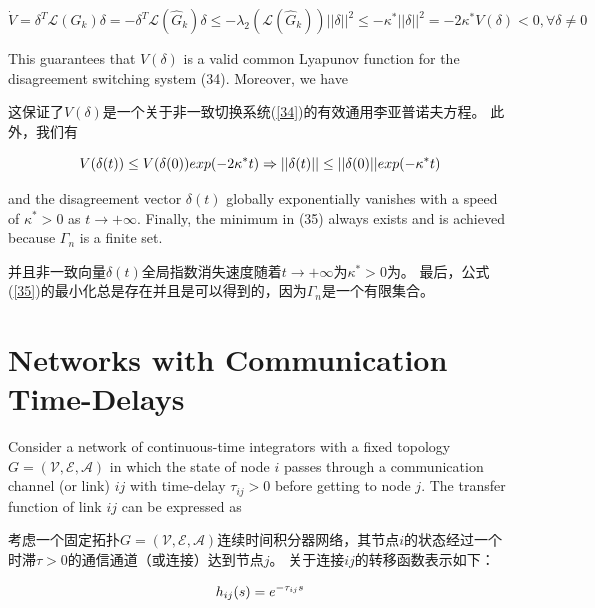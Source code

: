 \documentclass{article}
\begin{document}
\begin{equation}
    \tag{36}
    \label{36}
    \dot{V} = \delta^T\mathcal{L}(G_k)\delta = -\delta^T\mathcal{L}(\hat{G}_k)\delta \le -\lambda_2(\mathcal{L}(\hat{G}_k))||\delta||^2 \le -\kappa^*||\delta||^2 = -2\kappa^*V(\delta)<0,\forall \delta \ne 0
\end{equation}

{\color[gray]{0.5}
\noindent This guarantees that $V(\delta)$ is a valid common Lyapunov function for the disagreement switching system (34). 
Moreover, we have
}

\noindent 这保证了$V(\delta)$是一个关于非一致切换系统(\ref{34})的有效通用李亚普诺夫方程。
此外，我们有

\begin{equation}
    \notag
    V(\delta(t)) \le V(\delta(0))exp(-2\kappa^*t) \Rightarrow ||\delta(t)|| \le ||\delta(0)||exp(-\kappa^*t)
\end{equation}

{\color[gray]{0.5}
\noindent and the disagreement vector $\delta(t)$ globally exponentially vanishes with a speed of $\kappa^* > 0$ as $t\rightarrow +\infty$. 
Finally, the minimum in (35) always exists and is achieved because $\Gamma_n$ is a ﬁnite set.
}

\noindent 并且非一致向量$\delta(t)$全局指数消失速度随着$t\rightarrow +\infty$为$\kappa^* > 0$为。
最后，公式(\ref{35})的最小化总是存在并且是可以得到的，因为$\Gamma_n$是一个有限集合。

\section{Networks with Communication Time-Delays}
{\color[gray]{0.5}
\noindent Consider a network of continuous-time integrators with a fixed topology $G=(\mathcal{V}, \mathcal{E}, \mathcal{A})$ in which the state of node $i$ passes through a communication channel (or link) $ij$ with time-delay $\tau_{ij}>0$ before getting to node $j$. 
The transfer function of link $ij$ can be expressed as 
}

\noindent 考虑一个固定拓扑$G=(\mathcal{V}, \mathcal{E}, \mathcal{A})$连续时间积分器网络，其节点$i$的状态经过一个时滞$\tau > 0$的通信通道（或连接）达到节点$j$。
关于连接$ij$的转移函数表示如下：

\begin{equation}
    h_{ij}(s) = e^{-\tau_{ij}s}
    \notag
\end{equation}
\end{document}
